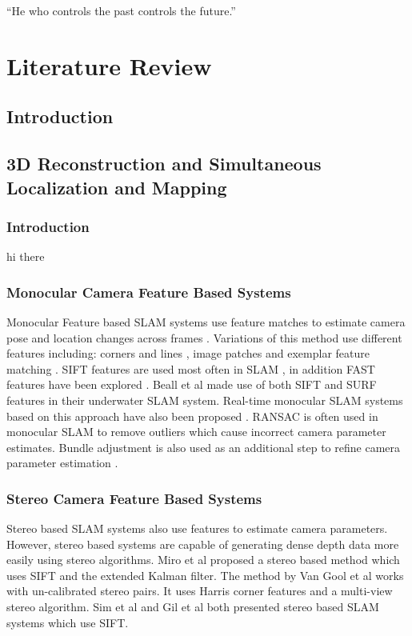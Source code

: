 \begin{savequote}[8cm]
  ``He who controls the past controls the future.''
\end{savequote}
\makeatletter
\chapter{Literature Review}

\section{Introduction}

\section{3D Reconstruction and Simultaneous Localization and Mapping}
\subsection{Introduction}
hi there
\subsection{Monocular Camera Feature Based Systems}
Monocular Feature based SLAM systems use feature matches to estimate camera pose and location changes across frames \cite{Davison02Simultaneous}. Variations of this method use different features including: corners and lines \cite{Jeong06Visual}, image patches \cite{Silveira08Efficient} and exemplar feature matching \cite{Chekhlov07Robust}. SIFT features are used most often in SLAM \cite{Jensfelt06Framework,Pollefeys08Detailed,Beall11Bundle,Eudes10Fast}, in addition FAST features have been explored \cite{Kundu10Realtime,Leelasawassuk133d,Konolige10View,Konolige08Frameslam}. Beall et al \cite{Beall11Bundle} made use of both SIFT and SURF features in their underwater SLAM system. Real-time monocular SLAM systems based on this approach have also been proposed \cite{Chekhlov07Robust,Pollefeys08Detailed}. RANSAC is often used in monocular SLAM \cite{Eudes10Fast,Kundu10Realtime,Konolige10View,Konolige08Frameslam,Pradeep13Monofusion} to remove outliers which cause incorrect camera parameter estimates. Bundle adjustment is also used as an additional step to refine camera parameter estimation \cite{Eudes10Fast}. 
\subsection{Stereo Camera Feature Based Systems}
Stereo based SLAM systems also use features to estimate camera parameters. However, stereo based systems are capable of generating dense depth data more easily using stereo algorithms. Miro et al \cite{Miro06Towards} proposed a stereo based method which uses SIFT and the extended Kalman filter. The method by Van Gool et al \cite{Pollefeys04Visual} works with un-calibrated stereo pairs. It uses Harris corner features and a multi-view stereo algorithm. Sim et al \cite{Sim05Vision} and Gil et al \cite{Gil06Improving} both presented stereo based SLAM systems which use SIFT.


